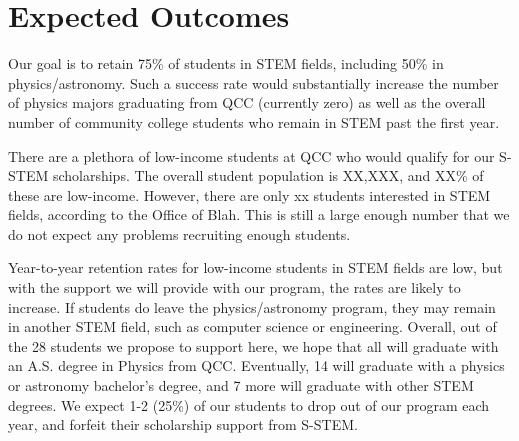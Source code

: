 \documentclass[12pt]{article}
\newcommand\reword[1]{{\color{red}#1}}
\begin{document}
\section{Expected Outcomes}
Our goal is to retain 75\% of students in STEM fields, including 50\% in physics/astronomy.  Such a success rate would substantially increase the number of physics majors graduating from QCC (currently zero) as well as the overall number of community college students who remain in STEM past the first year.  

There are a plethora of low-income students at QCC who would qualify for our S-STEM scholarships.  The overall student population is \reword{XX,XXX}, and \reword{XX}\% of these are low-income.  However, there are only \reword{xx} students interested in STEM fields, according to the Office of \reword{Blah}.  This is still a large enough number that we do not expect any problems recruiting enough students.  

Year-to-year retention rates for low-income students in STEM fields are low, but with the support we will provide with our program, the rates are likely to increase.  If students do leave the physics/astronomy program, they may remain in another STEM field, such as computer science or engineering.  Overall, out of the 28 students we propose to support here, we hope that all will graduate with an A.S. degree in Physics from QCC.  Eventually, 14 will graduate with a physics or astronomy bachelor's degree, and 7 more will graduate with other STEM degrees.  We expect 1-2 (25\%) of our students to drop out of our program each year, and forfeit their scholarship support from S-STEM.


\end{document}
